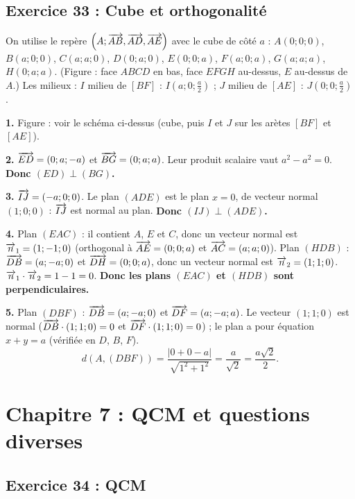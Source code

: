 \subsection{Exercice 33 : Cube et orthogonalit\'e}

On utilise le rep\`ere $\left(A;\overrightarrow{AB},\overrightarrow{AD},\overrightarrow{AE}\right)$ avec le cube de c\^ot\'e $a$ :
$A(0;0;0)$, $B(a;0;0)$, $C(a;a;0)$, $D(0;a;0)$, $E(0;0;a)$, $F(a;0;a)$, $G(a;a;a)$, $H(0;a;a)$.
(Figure : face $ABCD$ en bas, face $EFGH$ au-dessus, $E$ au-dessus de $A$.)
Les milieux : $I$ milieu de $[BF]$ : $I\left(a;0;\frac a2\right)$ ; $J$ milieu de $[AE]$ : $J\left(0;0;\frac a2\right)$.

\textbf{1.} Figure : voir le sch\'ema ci-dessus (cube, puis $I$ et $J$ sur les ar\`etes $[BF]$ et $[AE]$).

\textbf{2.} $\overrightarrow{ED}=(0;a;-a)$ et $\overrightarrow{BG}=(0;a;a)$. Leur produit scalaire vaut $a^2-a^2=0$.
\textbf{Donc $(ED)\perp(BG)$.}

\textbf{3.} $\overrightarrow{IJ}=\left(-a;0;0\right)$. Le plan $(ADE)$ est le plan $x=0$, de vecteur normal $(1;0;0)$ :
$\overrightarrow{IJ}$ est normal au plan. \textbf{Donc $(IJ)\perp(ADE)$.}

\textbf{4.} Plan $(EAC)$ : il contient $A$, $E$ et $C$, donc un vecteur normal est $\overrightarrow{n}_1=(1;-1;0)$
(orthogonal \`a $\overrightarrow{AE}=(0;0;a)$ et $\overrightarrow{AC}=(a;a;0)$).
Plan $(HDB)$ : $\overrightarrow{DB}=(a;-a;0)$ et $\overrightarrow{DH}=(0;0;a)$, donc un vecteur normal est $\overrightarrow{n}_2=(1;1;0)$.
$\overrightarrow{n}_1\cdot\overrightarrow{n}_2=1-1=0$. \textbf{Donc les plans $(EAC)$ et $(HDB)$ sont perpendiculaires.}

\textbf{5.} Plan $(DBF)$ : $\overrightarrow{DB}=(a;-a;0)$ et $\overrightarrow{DF}=(a;-a;a)$. Le vecteur $(1;1;0)$ est normal ($\overrightarrow{DB}\cdot(1;1;0)=0$ et
$\overrightarrow{DF}\cdot(1;1;0)=0$) ; le plan a pour \'equation $x+y=a$ (v\'erifi\'ee en $D$, $B$, $F$).
\[
d(A,(DBF))=\frac{|0+0-a|}{\sqrt{1^2+1^2}}=\frac{a}{\sqrt2}=\frac{a\sqrt2}{2}.
\]

\section{Chapitre 7 : QCM et questions diverses}

\subsection{Exercice 34 : QCM}

